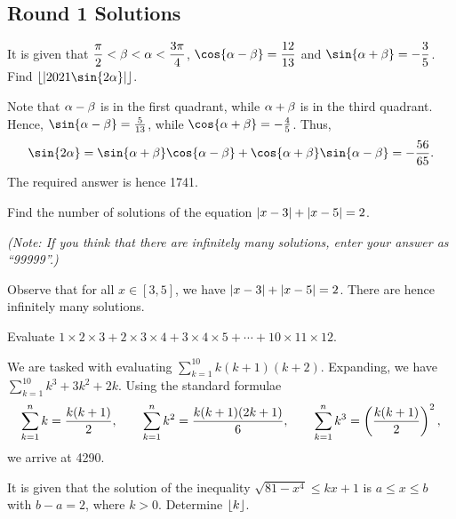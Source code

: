 \subsection{Round 1 Solutions}\label{S::2021-O-1}


\begin{question}[1741]\label{A::2021-O-1-1}
    It is given that $\dfrac\pi2 < \beta < \alpha < \dfrac{3\pi}{4}$, $\cos{\a - \b} = \dfrac{12}{13}$ and $\sin{\a + \b} = -\dfrac35$. Find $\floor{\abs{2021\sin{2\a}}}$.
\end{question}

Note that $\alpha - \beta$ is in the first quadrant, while $\alpha + \beta$ is in the third quadrant. Hence, $\sin{\a - \b} = \frac{5}{13}$, while $\cos{\a + \b} = -\frac45$. Thus, \[\sin{2\a} = \sin{\a + \b} \cos{\a - \b} + \cos{\a + \b} \sin{\a - \b} = -\frac{56}{65}.\] The required answer is hence 1741.

\begin{question}[99999]\label{A::2021-O-1-2}
    Find the number of solutions of the equation $\left\lvert x - 3 \right\rvert + \left\lvert x - 5 \right\rvert = 2$.

    \noindent \textit{(Note: If you think that there are infinitely many solutions, enter your answer as ``99999''.)}
\end{question}

Observe that for all $x \in [3, 5]$, we have $\left\lvert x - 3 \right\rvert + \left\lvert x - 5 \right\rvert = 2$. There are hence infinitely many solutions.

\begin{question}[4290]\label{A::2021-O-1-3}
    Evaluate $1 \times 2 \times 3 + 2 \times 3 \times 4 + 3 \times 4 \times 5 + \cdots + 10 \times 11 \times 12$.
\end{question}

We are tasked with evaluating $\displaystyle\sum_{k = 1}^{10} k(k+1)(k+2)$. Expanding, we have $\displaystyle\sum_{k = 1}^{10} k^3 + 3k^2 + 2k$. Using the standard formulae \[\sum_{k=1}^n k = \frac{k(k+1)}{2}, \qquad \sum_{k=1}^n k^2 = \frac{k(k+1)(2k+1)}{6}, \qquad \sum_{k=1}^n k^3 = \left( \frac{k(k+1)}{2} \right)^2,\] we arrive at 4290.

\clearpage
\begin{question}[7]\label{A::2021-O-1-4}
    It is given that the solution of the inequality $\sqrt{81 - x^4} \leq kx + 1$ is $a \leq x \leq b$ with $b - a = 2$, where $k > 0$. Determine $\left\lfloor k \right\rfloor$.
\end{question}

